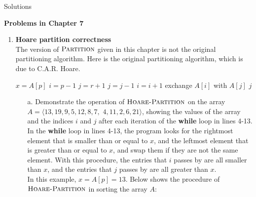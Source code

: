 \documentclass[12pt,reqno]{amsart}
\newif\ifanswer
\begin{document}
\hspace{10.5cm} {\footnotesize Solutions}

\vspace{0.5cm}
\hspace{5.5cm}\textbf{\large Problems in Chapter 7}
\vspace{0.5cm}

\begin{enumerate}[1.]

\item \textbf{Hoare partition correctness}\\ The version of $\textsc{Partition}$ given in this chapter is not the original partitioning algorithm. Here is the original partitioning algorithm, which is due to C.A.R. Hoare.
\begin{algorithm}
    \caption{$\textsc{Hoare-Partition}(A, p, r)$}
    \begin{algorithmic}[1]
        \STATE $x = A[p]$
        \STATE $i = p - 1$
        \STATE $j = r + 1$
            \REPEAT
                \STATE $j = j - 1$
            \REPEAT
                \STATE $i = i + 1$
                \STATE exchange $A[i]$ with $A[j]$
            \ELSE
                \RETURN $j$
            \ENDIF
        \ENDWHILE
    \end{algorithmic}
\end{algorithm}
\begin{enumerate}
    \item[a.] Demonstrate the operation of $\textsc{Hoare-Partition}$ on the array $A = \langle 13, 19, 9, 5, 12, 8, 7,$ $4, 11, 2, 6, 21 \rangle$, showing the values of the array and the indices $i$ and $j$ after each iteration of the \textbf{while} loop in lines 4-13.
    \ifanswer
    \noindent {\bf \\Solution}
    In the \textbf{while} loop in lines 4-13, the program looks for the rightmost element that is smaller than or equal to $x$, and the leftmost element that is greater than or equal to $x$, and swap them if they are not the same element. With this procedure, the entries that $i$ passes by are all smaller than $x$, and the entries that $j$ passes by are all greater than $x$.\\
    In this example, $x = A[p] = 13$. Below shows the procedure of $\textsc{Hoare-Partition}$ in sorting the array $A$:
    \newpage
    \begin{center}

\end{center}
\end{enumerate}
\end{enumerate}
\end{document}
